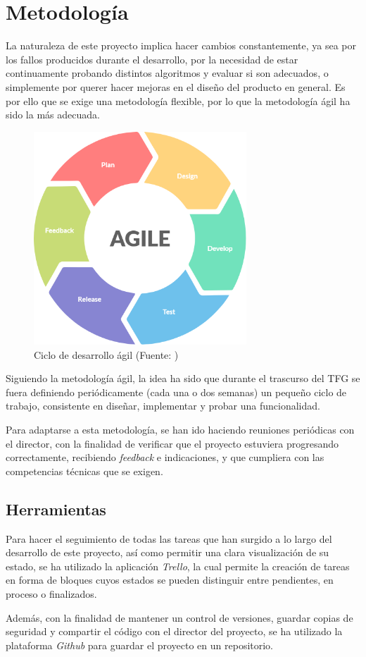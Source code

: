 \chapter{Metodología}\label{chapter:metodologia}

La naturaleza de este proyecto implica hacer cambios constantemente, ya sea por los fallos producidos durante el desarrollo, por la necesidad de estar continuamente probando distintos algoritmos y evaluar si son adecuados, o simplemente por querer hacer mejoras en el diseño del producto en general. Es por ello que se exige una metodología flexible, por lo que la metodología ágil ha sido la más adecuada.

\begin{figure}[H]
    \centering
    \includegraphics[width=8cm]{figures/agile.png}
    \caption[Ciclo de desarrollo ágil]{Ciclo de desarrollo ágil (Fuente: \parencite{agile-figure})}
    \label{agile}
\end{figure}

Siguiendo la metodología ágil, la idea ha sido que durante el trascurso del TFG se fuera definiendo periódicamente (cada una o dos semanas) un pequeño ciclo de trabajo, consistente en diseñar, implementar y probar una funcionalidad.

Para adaptarse a esta metodología, se han ido haciendo reuniones periódicas con el director, con la finalidad de verificar que el proyecto estuviera progresando correctamente, recibiendo \emph{feedback} e indicaciones, y que cumpliera con las competencias técnicas que se exigen.

\section{Herramientas}

Para hacer el seguimiento de todas las tareas que han surgido a lo largo del desarrollo de este proyecto, así como permitir una clara visualización de su estado, se ha utilizado la aplicación \emph{Trello}, la cual permite la creación de tareas en forma de bloques cuyos estados se pueden distinguir entre pendientes, en proceso o finalizados.

Además, con la finalidad de mantener un control de versiones, guardar copias de seguridad y compartir el código con el director del proyecto, se ha utilizado la plataforma \emph{Github} para guardar el proyecto en un repositorio.



